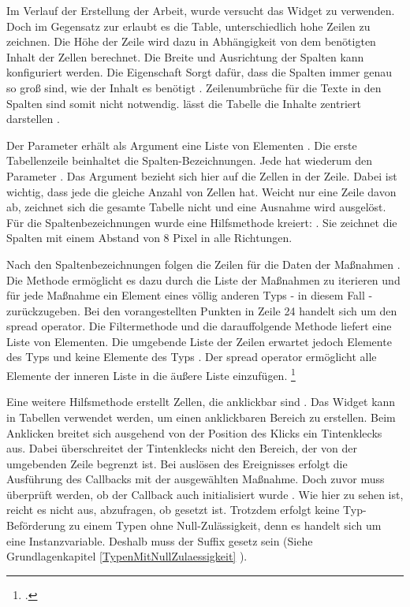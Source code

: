Im Verlauf der Erstellung der Arbeit, wurde versucht das Widget  zu verwenden.
Doch im Gegensatz zur  erlaubt es die Table, unterschiedlich hohe Zeilen zu zeichnen.
Die Höhe der Zeile wird dazu in Abhängigkeit von dem benötigten Inhalt der Zellen berechnet.
Die Breite und Ausrichtung der Spalten kann konfiguriert werden.
Die Eigenschaft  Sorgt dafür, dass die Spalten immer genau so groß sind, wie der Inhalt es benötigt .  Zeilenumbrüche für die Texte in den Spalten sind somit nicht notwendig. lässt die  Tabelle die Inhalte zentriert darstellen .

Der Parameter  erhält als Argument eine Liste von  Elementen .
Die erste Tabellenzeile  beinhaltet die Spalten-Bezeichnungen.
Jede  hat wiederum den Parameter .
Das Argument bezieht sich hier auf die Zellen in der Zeile.
Dabei ist wichtig, dass jede  die gleiche Anzahl von Zellen hat.
Weicht nur eine Zeile davon ab, zeichnet sich die gesamte Tabelle nicht und eine Ausnahme wird ausgelöst.
Für die Spaltenbezeichnungen wurde eine Hilfsmethode kreiert:  .
Sie zeichnet die Spalten mit einem Abstand von 8 Pixel in alle Richtungen.

Nach den Spaltenbezeichnungen folgen die Zeilen für die Daten der Maßnahmen .
Die Methode   ermöglicht es dazu durch die Liste der Maßnahmen zu iterieren und für jede Maßnahme ein Element eines völlig anderen Typs - in diesem Fall  - zurückzugeben.
Bei den vorangestellten Punkten  in Zeile 24 handelt sich um den spread operator. Die Filtermethode  und die darauffolgende Methode  liefert eine Liste von  Elementen. Die umgebende Liste der Zeilen   erwartet jedoch Elemente des Typs  und keine Elemente des Typs . Der spread operator ermöglicht alle Elemente der inneren Liste in die äußere Liste einzufügen. \footcite[Vgl.][]{SpreadOperator}

Eine weitere Hilfsmethode  erstellt Zellen, die anklickbar sind .
Das Widget   kann in Tabellen verwendet werden, um einen anklickbaren Bereich zu erstellen.
Beim  Anklicken breitet sich ausgehend von der Position des Klicks ein Tintenklecks  aus.
Dabei überschreitet der Tintenklecks nicht den Bereich, der von der umgebenden Zeile begrenzt ist.
Bei auslösen des Ereignisses  erfolgt die Ausführung des Callbacks   mit der ausgewählten Maßnahme.
Doch zuvor muss überprüft werden, ob der Callback auch initialisiert wurde .
Wie hier zu sehen ist, reicht es nicht aus, abzufragen, ob   gesetzt ist.
Trotzdem erfolgt keine Typ-Beförderung zu einem Typen ohne Null-Zulässigkeit, denn es handelt sich um eine Instanzvariable.
Deshalb muss der Suffix \IC{!} gesetz sein (Siehe Grundlagenkapitel \ref{TypenMitNullZulaessigkeit} ).

